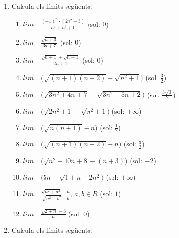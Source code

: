 \documentclass{article}
\begin{document}
\begin{enumerate}
\begin{enumerate}
\end{enumerate}
 
 \item Calcula els límits següents:
 
 \begin{enumerate}
 	\item $lim \quad \frac{(-1)^n\cdot (2n^2+3)}{n^4+n^3+1}$ (sol: $0$)
 	\item $lim \quad \frac{\sqrt{n+3}}{3n+7}$ (sol: $0$)
 	\item $lim \quad \frac{\sqrt{n+1}+\sqrt{n-1}}{2n+1}$ (sol: $0$)
 	\item $lim \quad \Big(\sqrt{(n+1)(n+2)}-\sqrt{n^2+1}\Big)$ (sol: $\frac{3}{2}$)
 	\item $lim \quad \Big(\sqrt{3n^2+4n+7}-\sqrt{3n^2-5n+2}\Big)$ (sol: $\frac{3\sqrt{3}}{2}$)
 	\item $lim \quad \Big(\sqrt{2n^2+1}-\sqrt{n^2+1}\Big)$ (sol: $+\infty$)
 	\item $lim \quad \Big(\sqrt{n(n+1)}-n\Big)$ (sol: $\frac{1}{2}$)
 	\item $lim \quad \Big(\sqrt{(n+1)(n+2)}-n\Big)$ (sol: $\frac{3}{2}$)
 	\item $lim \quad \Big(\sqrt{n^2-10n+8}-(n+3)\Big)$ (sol: $-2$)
 	\item $lim \quad \Big(5n-\sqrt{1+n+2n^2}\Big)$ (sol: $+\infty$)
 	\item $lim \quad \frac{\sqrt{n^2+a^2}-a}{\sqrt{n^2+b^2}-b}$, $a,b \in R$ (sol: $1$)
 	\item $lim \quad \frac{\sqrt{2+n}-3}{n}$ (sol: $0$)
 	
 \end{enumerate}

\item Calcula els límits següents:


\end{enumerate}
\end{document}
